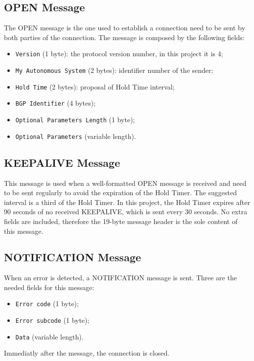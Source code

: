 \subsection{OPEN Message}
The OPEN message is the one used to establish a connection need to be sent by both parties of the connection.
The message is composed by the following fields:
\begin{itemize}
 \item \texttt{Version} (1 byte): the protocol version number, in this project it is 4;
 \item \texttt{My Autonomous System} (2 bytes): identifier number of the sender;
 \item \texttt{Hold Time} (2 bytes): proposal of Hold Time interval;
 \item \texttt{BGP Identifier} (4 bytes);
 \item \texttt{Optional Parameters Length} (1 byte);
 \item \texttt{Optional Parameters} (variable length).
\end{itemize}


\subsection{KEEPALIVE Message}
This message is used when a well-formatted OPEN message is received and need to be sent regularly to avoid the expiration of the Hold Timer. The suggested interval is a third of the Hold Timer. In this project, the Hold Timer expires after 90 seconds of no received KEEPALIVE, which is sent every 30 seconds. No extra fields are included, therefore the 19-byte message header is the sole content of this message.


\subsection{NOTIFICATION Message}
When an error is detected, a NOTIFICATION message is sent. Three are the needed fields for this message:
\begin{itemize}
 \item \texttt{Error code} (1 byte);
 \item \texttt{Error subcode} (1 byte);
 \item \texttt{Data} (variable length).
\end{itemize}
Immediatly after the message, the connection is closed.

